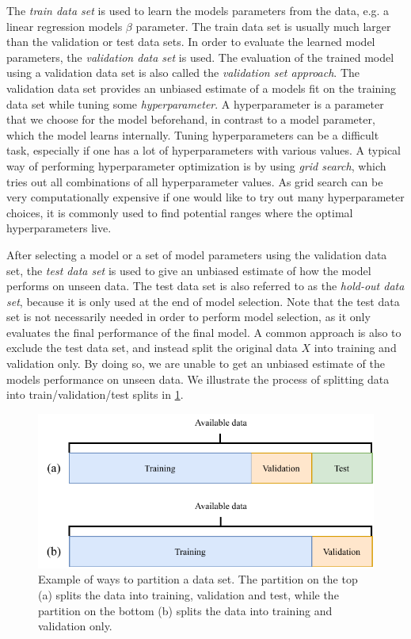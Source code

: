 The \textit{train data set} is used to learn the models parameters from the data, e.g. a linear regression models $\beta$ parameter. The train data set is usually much larger than the validation or test data sets. In order to evaluate the learned model parameters, the \textit{validation data set} is used. The evaluation of the trained model using a validation data set is also called the \textit{validation set approach}. The validation data set provides an unbiased estimate of a models fit on the training data set while tuning some \textit{hyperparameter}. A hyperparameter is a parameter that we choose for the model beforehand, in contrast to a model parameter, which the model learns internally. Tuning hyperparameters can be a difficult task, especially if one has a lot of hyperparameters with various values. A typical way of performing hyperparameter optimization is by using \textit{grid search}, which tries out all combinations of all hyperparameter values. As grid search can be very computationally expensive if one would like to try out many hyperparameter choices, it is commonly used to find potential ranges where the optimal hyperparameters live.

After selecting a model or a set of model parameters using the validation data set, the \textit{test data set} is used to give an unbiased estimate of how the model performs on unseen data. The test data set is also referred to as the \textit{hold-out data set}, because it is only used at the end of model selection. Note that the test data set is not necessarily needed in order to perform model selection, as it only evaluates the final performance of the final model. A common approach is also to exclude the test data set, and instead split the original data $X$ into training and validation only. By doing so, we are unable to get an unbiased estimate of the models performance on unseen data. We illustrate the process of splitting data into train/validation/test splits in \cref{fig:train-val-test-splits}.
\begin{figure}[H]
    \centering
    \includegraphics[width=\textwidth]{thesis/figures/train-val-test-splits_cropped.pdf}
    \caption{Example of ways to partition a data set. The partition on the top (a) splits the data into training, validation and test, while the partition on the bottom (b) splits the data into training and validation only.}
    \label{fig:train-val-test-splits}
\end{figure}

